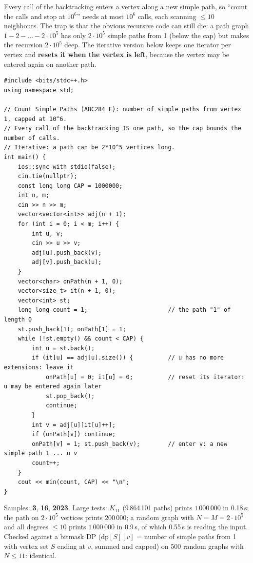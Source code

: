 \begin{solutionbox}
Every call of the backtracking enters a vertex along a new simple path, so ``count the calls and stop at $10^6$'' needs at most $10^6$ calls, each scanning $\le 10$ neighbours. The trap is that the obvious recursive code can still die: a path graph $1 - 2 - \dots - 2\cdot10^5$ has only $2\cdot10^5$ simple paths from 1 (below the cap) but makes the recursion $2\cdot10^5$ deep. The iterative version below keeps one iterator per vertex and \textbf{resets it when the vertex is left}, because the vertex may be entered again on another path.
\begin{lstlisting}[style=cpp]
#include <bits/stdc++.h>
using namespace std;

// Count Simple Paths (ABC284 E): number of simple paths from vertex 1, capped at 10^6.
// Every call of the backtracking IS one path, so the cap bounds the number of calls.
// Iterative: a path can be 2*10^5 vertices long.
int main() {
    ios::sync_with_stdio(false);
    cin.tie(nullptr);
    const long long CAP = 1000000;
    int n, m;
    cin >> n >> m;
    vector<vector<int>> adj(n + 1);
    for (int i = 0; i < m; i++) {
        int u, v;
        cin >> u >> v;
        adj[u].push_back(v);
        adj[v].push_back(u);
    }
    vector<char> onPath(n + 1, 0);
    vector<size_t> it(n + 1, 0);
    vector<int> st;
    long long count = 1;                       // the path "1" of length 0
    st.push_back(1); onPath[1] = 1;
    while (!st.empty() && count < CAP) {
        int u = st.back();
        if (it[u] == adj[u].size()) {          // u has no more extensions: leave it
            onPath[u] = 0; it[u] = 0;          // reset its iterator: u may be entered again later
            st.pop_back();
            continue;
        }
        int v = adj[u][it[u]++];
        if (onPath[v]) continue;
        onPath[v] = 1; st.push_back(v);        // enter v: a new simple path 1 ... u v
        count++;
    }
    cout << min(count, CAP) << "\n";
}
\end{lstlisting}
Samples: \textbf{3}, \textbf{16}, \textbf{2023}. Large tests: $K_{11}$ (9\,864\,101 paths) prints $1\,000\,000$ in 0.18\,s; the path on $2\cdot10^5$ vertices prints $200\,000$; a random graph with $N = M = 2\cdot10^5$ and all degrees $\le 10$ prints $1\,000\,000$ in 0.9\,s, of which 0.55\,s is reading the input. Checked against a bitmask DP ($\text{dp}[S][v]$ = number of simple paths from 1 with vertex set $S$ ending at $v$, summed and capped) on 500 random graphs with $N \le 11$: identical.
\end{solutionbox}

